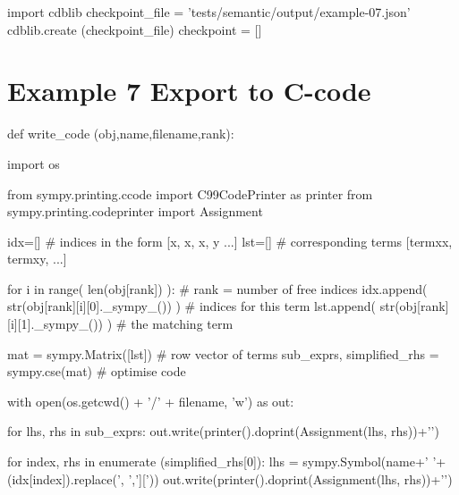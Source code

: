 \documentclass[12pt]{cdblatex}
\begin{document}
\bgroup
{}
\begin{cadabra}
   import cdblib
   checkpoint_file = 'tests/semantic/output/example-07.json'
   cdblib.create (checkpoint_file)
   checkpoint = []
\end{cadabra}
\egroup

\clearpage

\section*{Example 7 Export to C-code}

\begin{cadabra}
   def write_code (obj,name,filename,rank):

      import os

      from sympy.printing.ccode import C99CodePrinter as printer
      from sympy.printing.codeprinter import Assignment

      idx=[]  # indices in the form [{x, x}, {x, y} ...]
      lst=[]  # corresponding terms [termxx, termxy, ...]

      for i in range( len(obj[rank]) ):                 # rank = number of free indices
          idx.append( str(obj[rank][i][0]._sympy_()) )  # indices for this term
          lst.append( str(obj[rank][i][1]._sympy_()) )  # the matching term

      mat = sympy.Matrix([lst])                         # row vector of terms
      sub_exprs, simplified_rhs = sympy.cse(mat)        # optimise code

      with open(os.getcwd() + '/' + filename, 'w') as out:

         for lhs, rhs in sub_exprs:
            out.write(printer().doprint(Assignment(lhs, rhs))+'\n')

         for index, rhs in enumerate (simplified_rhs[0]):
            lhs = sympy.Symbol(name+' '+(idx[index]).replace(', ',']['))
            out.write(printer().doprint(Assignment(lhs, rhs))+'\n')
\end{cadabra}

\clearpage
\end{document}

